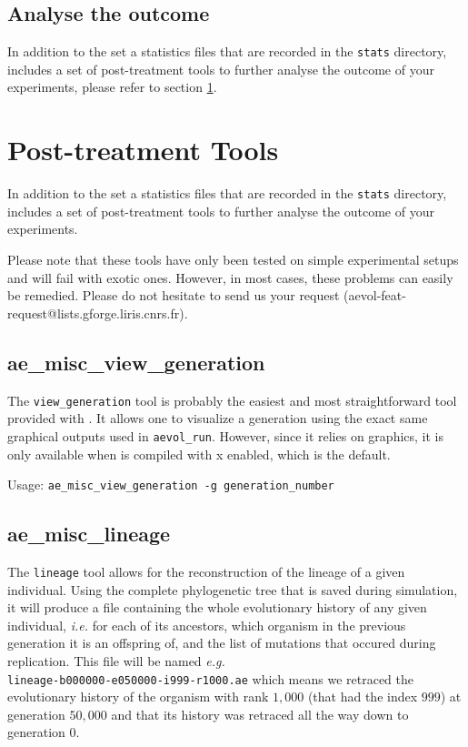 \subsection{Analyse the outcome}

In addition to the set a statistics files that are recorded in the \verb?stats? directory, \aevol{} includes a set of post-treatment tools to further analyse the outcome of your experiments, please refer to section \ref{sect:post-treatments}.


\section{Post-treatment Tools}
\label{sect:post-treatments}

In addition to the set a statistics files that are recorded in the \verb?stats? directory, \aevol{} includes a set of post-treatment tools to further analyse the outcome of your experiments.

Please note that these tools have only been tested on simple experimental setups and will fail with exotic ones.
However, in most cases, these problems can easily be remedied. Please do not hesitate to send us your request (aevol-feat-request@lists.gforge.liris.cnrs.fr).

\subsection{ae\_misc\_view\_generation}
The \verb?view_generation? tool is probably the easiest and most straightforward tool provided with \aevol{}.
It allows one to visualize a generation using the exact same graphical outputs used in \verb?aevol_run?.
However, since it relies on graphics, it is only available when \aevol{} is compiled with x enabled, which is the default.

Usage: \verb?ae_misc_view_generation -g generation_number?

\subsection{ae\_misc\_lineage}
\label{sect:lineage}
The \verb?lineage? tool allows for the reconstruction of the lineage of a given individual.
Using the complete phylogenetic tree that is saved during simulation, it will produce a file containing the whole evolutionary history of any given individual, \emph{i.e.} for each of its ancestors, which organism in the previous generation it is an offspring of, and the list of mutations that occured during replication. This file will be named \emph{e.g.} \\\verb?lineage-b000000-e050000-i999-r1000.ae? which means we retraced the evolutionary history of the organism with rank $1,000$ (that had the index $999$) at generation $50,000$ and that its history was retraced all the way down to generation $0$.

